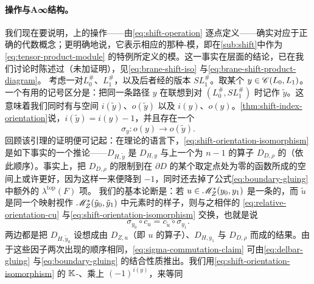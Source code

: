 \paragraph{\trSuspension{}操作与A∞结构。}\label{sub:shift-and-a-infinity-structure}
我们现在要说明，\trExactLagrangianBrane{}上的\trSuspension{}操作——由\eqref{eq:shift-operation} 逐点定义——确实对应于正确的代数概念；更明确地说，它表示相应的那种\trAinfty-模，即在\cref{sub:shift}中作为\eqref{eq:tensor-product-module} 的特例所定义的模。这一事实在\trCohomology{}层面的结论，已在我们讨论\trFloerCohomology{}时陈述过（未加证明），见\eqref{eq:brane-shift-iso} 与\eqref{eq:brane-shift-product-diagram}。
考虑一对\trExactLagrangianBrane{}$L_0^{\#}$、$L_1^{\#}$，以及后者经\trSuspension{}的版本 $SL_1^{\#}$。取某个 $y\in\mathscr{C}(L_0,L_1)$。一个有用的记号区分是：把同一条路径 $y$ 在联想到\trBrane{}对 $(L_0^{\#},SL_1^{\#})$ 时记作 $\tilde{y}$。这意味着我们同时有\trIndex{}与\trOrientation{}空间 $i(\tilde{y})$、$o(\tilde{y})$ 以及 $i(y)$、$o(y)$。\cref{thm:shift-index-orientation}说，$i(\tilde{y})=i(y)-1$，并且存在一个\trCanonical\trIsomorphism
\begin{equation}\label{eq:shift-orientation-isomorphism}
\sigma_y\colon o(y)\longrightarrow o(\tilde{y}).
\end{equation}
回顾该引理的证明便可记起：在\trIndex{}理论的语言下，\eqref{eq:shift-orientation-isomorphism} 是如下事实的一个推论——\trOrientationOperator{}$D_{H,\tilde{y}}$ 是 $D_{H,y}$ 与\trDisk{}上一个\trIndex{}为 $n-1$ 的算子 $D_{D,\rho}$ 的\trBoundaryConnectedSum{}（依此顺序）。事实上，把 $D_{D,\rho}$ 的\trDomain{}限制到在 $\partial D$ 的某个取定点处为零的函数所成的空间上或许更好，因为这样一来\trIndex{}便降到 $-1$，同时还去掉了\trGluing{}公式\eqref{eq:boundary-gluing} 中额外的 $\lambda^{\mathrm{top}}(F)$ 项。
我们的基本论断是：若 $u\in\mathscr{M}^{*}_Z(y_0,y_1)$ 是一条\trIsolated{}的\trFloer{}\trTrajectory，而 $\tilde{u}$ 是同一个映射视作 $\mathscr{M}^{*}_Z(\tilde{y}_0,\tilde{y}_1)$ 中元素时的样子，则与之相伴的\trIsomorphism{} \eqref{eq:relative-orientation-cu} 与\eqref{eq:shift-orientation-isomorphism} 交换，也就是说
\begin{equation}\label{eq:sigma-commutation-claim}
\sigma_{y_0}\circ c_u=c_{\tilde{u}}\circ\sigma_{y_1}.
\end{equation}
两边都是把 $D_{H,\tilde{y}_0}$ 设想成由 $D_{Z,u}$（即 $u$ 的\trLinearization{}算子）、$D_{H,y_1}$ 与 $D_{D,\rho}$ \trGluing{}而成的结果。由于这些因子两次出现的顺序相同，\eqref{eq:sigma-commutation-claim} 可由\eqref{eq:delbar-gluing} 与\eqref{eq:boundary-gluing} 的结合性质推出。我们用\eqref{eq:shift-orientation-isomorphism} 的 $\mathbb{K}$-\trNormalization{}、乘上 $(-1)^{i(y)}$，来等同
